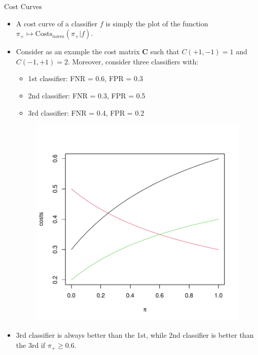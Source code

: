 \documentclass[11pt,compress,t,notes=noshow, xcolor=table]{beamer}
\begin{document}
		\begin{frame}{Cost Curves}
		\footnotesize
			\begin{itemize}
				\item A cost curve of a classifier $f$ is simply the plot of the function $\pi_+ \mapsto \mathrm{Costs}_{norm}(\pi_+ | f).$
				\item Consider as an example the cost matrix $\mathbf{C}$ such that $C(+1,-1)  = 1$ and $C(-1,+1) = 2.$ Moreover, consider three classifiers with:
				\begin{minipage}{0.45\textwidth}
					\begin{itemize}
						\scriptsize
						\item 1st classifier: FNR = 0.6, FPR = 0.3
						\item {\color{red} 2nd classifier}: FNR = 0.3, FPR = 0.5
						\item {\color{green} 3rd classifier}: FNR = 0.4, FPR = 0.2
					\end{itemize}
				\end{minipage}
				\begin{minipage}{0.45\textwidth}
					\begin{figure}
						\centering
						\includegraphics[width=0.7\linewidth]{figure_man/cost_curve_example}
					\end{figure}
				\end{minipage}
%			
				\item 3rd classifier is always better than the 1st, while 2nd classifier is better than the 3rd if $\pi_+\geq 0.6.$
			
			\end{itemize}
	\end{frame}
\end{document}
